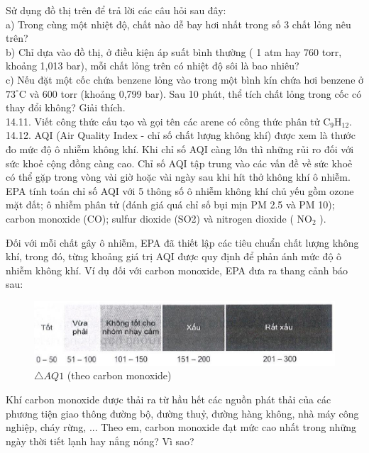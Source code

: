 \documentclass[10pt]{article}
\begin{document}
Sử dụng đồ thị trên để trả lời các câu hỏi sau đây:\\
a) Trong cùng một nhiệt độ, chất nào dễ bay hơi nhất trong số 3 chất lỏng nêu trên?\\
b) Chỉ dựa vào đồ thị, ở điều kiện áp suất bình thường ( 1 atm hay 760 torr, khoảng 1,013 bar), mỗi chất lỏng trên có nhiệt độ sôi là bao nhiêu?\\
c) Nếu đặt một cốc chứa benzene lỏng vào trong một bình kín chứa hơi benzene ở $73^{\circ} \mathrm{C}$ và 600 torr (khoảng 0,799 bar). Sau 10 phút, thể tích chất lỏng trong cốc có thay đổi không? Giải thích.\\
14.11. Viết công thức cấu tạo và gọi tên các arene có công thức phân tử $\mathrm{C}_{9} \mathrm{H}_{12}$.\\
14.12. AQI (Air Quality Index - chỉ số chất lượng không khí) được xem là thước đo mức độ ô nhiễm không khí. Khi chỉ số AQI càng lớn thì những rủi ro đối với sức khoẻ cộng đồng càng cao. Chỉ số AQI tập trung vào các vấn đề về sức khoẻ có thể gặp trong vòng vài giờ hoặc vài ngày sau khi hít thở không khí ô nhiễm.\\
EPA tính toán chỉ số AQI với 5 thông số ô nhiễm không khí chủ yếu gồm ozone mặt đất; ô nhiễm phân tử (đánh giá quá chỉ số bụi mịn PM 2.5 và PM 10); carbon monoxide (CO); sulfur dioxide (SO2) và nitrogen dioxide ( $\mathrm{NO}_{2}$ ).

Đối với mỗi chất gây ô nhiễm, EPA đã thiết lập các tiêu chuẩn chất lượng không khí, trong đó, từng khoảng giá trị AQI được quy định để phản ánh mức độ ô nhiễm không khí. Ví dụ đối với carbon monoxide, EPA đưa ra thang cảnh báo sau:

\begin{figure}[h]
\begin{center}
  \includegraphics[width=\textwidth]{2025_10_23_ae7aef68fb3b41082d29g-29}
\captionsetup{labelformat=empty}
\caption{$\triangle A Q 1$ (theo carbon monoxide)}
\end{center}
\end{figure}

Khí carbon monoxide được thải ra từ hầu hết các nguồn phát thải của các phương tiện giao thông đường bộ, đường thuỷ, đường hàng không, nhà máy công nghiệp, cháy rừng, ... Theo em, carbon monoxide đạt mức cao nhất trong những ngày thời tiết lạnh hay nắng nóng? Vì sao?
\end{document}
